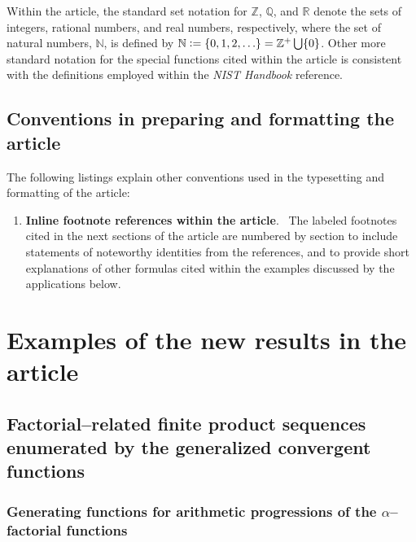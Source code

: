 \documentclass[12pt,reqno]{article}
\numberwithin{sfootnote}{section}
\numberwithin{equation}{section}
\renewcommand{\labelenumi}{\textbf{\arabic{enumi}.}}
\renewcommand{\labelenumi}{$\mathsmaller{\blacktriangleright}$ }
\theoremstyle{plain}
\theoremstyle{definition}
\theoremstyle{remark}
\newcommand{\defequals}{\ensuremath{\vcentcolon=}}
\begin{document}
Within the article, the standard set notation for 
$\mathbb{Z}$, $\mathbb{Q}$, and $\mathbb{R}$ 
denote the sets of integers, rational numbers, and real numbers, respectively, 
where the set of natural numbers, $\mathbb{N}$, is defined by 
$\mathbb{N} \defequals \{0, 1, 2, \ldots \} = \mathbb{Z}^{+} \bigcup \{0\}$. 
Other more standard notation for the special functions 
cited within the article is consistent with the definitions 
employed within the \emph{NIST Handbook} reference. 

\subsection{Conventions in preparing and formatting the article} 

The following listings explain other conventions used in the 
typesetting and formatting of the article: 
\begin{enumerate} 
     \renewcommand{\labelenumi}{$\mathsmaller{\blacktriangleright}$ } 
     \setlength{\itemsep}{-1mm} 
     \newcommand{\localitemlabel}[1]{\textbf{#1}.\ } 

\item \localitemlabel{Inline footnote references within the article} 
The labeled footnotes cited in the next sections of the article 
are numbered by section to include statements of noteworthy identities 
from the references, and to provide short explanations of other 
formulas cited within the examples discussed by the applications below. 

\end{enumerate} 

\section{Examples of the new results in the article} 
\label{subSection_Intro_Examples} 

\subsection{Factorial--related finite product sequences 
            enumerated by the 
            generalized convergent functions} 
\label{subsubSection_Intro_Examples_Fact-RelatedSeqs_GenByTheConvFns} 
\label{prop_Conv-Based_Defs_for_FactFn_Variants} 
\label{cor_NumericalMultiFactSeqsEnum_Alpha1234} 

\subsubsection{Generating functions for arithmetic progressions of the 
               $\alpha$--factorial functions} 
\end{document}
